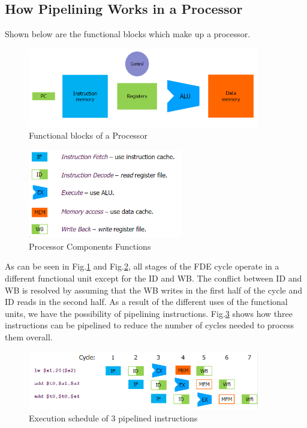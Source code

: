 \subsection{How Pipelining Works in a Processor}
Shown below are the functional blocks which make up a processor. 
\begin{figure}[H]
    \centering
    \includegraphics[width=0.9\textwidth]{assets/processor-components.png} 
    \caption{Functional blocks of a Processor}
    \label{fig:processor-components}
\end{figure}
\begin{figure}[H]
    \centering
    \includegraphics[width=0.6\textwidth]{assets/processor-components-functions.png}
    \caption{Processor Components Functions} 
    \label{fig:processor-components-function}
\end{figure}

As can be seen in Fig.\ref{fig:processor-components} and Fig.\ref{fig:processor-components-function}, all stages of the FDE cycle operate in a different functional unit except for the ID and WB. The conflict between ID and WB is resolved by assuming that the WB writes in the first half of the cycle and ID reads in the second half. As a result of the different uses of the functional units, we have the possibility of pipelining instructions. Fig.\ref{fig:pipelining-execution-schedule} shows how three instructions can be pipelined to reduce the number of cycles needed to process them overall.
\begin{figure}[H]
    \centering
    \includegraphics[width=0.9\textwidth]{assets/pipelining-execution-schedule.png}
    \caption{Execution schedule of 3 pipelined instructions}
    \label{fig:pipelining-execution-schedule}
\end{figure}

